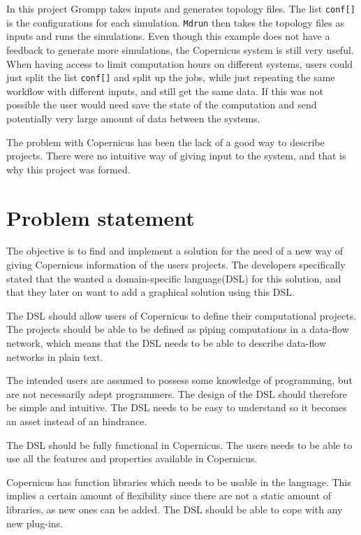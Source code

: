 In this project Grompp takes inputs and generates topology files. The
list \verb#conf[]# is the configurations for each
simulation. \verb#Mdrun# then takes the topology files as inputs and
runs the simulations. Even though this example does not have a
feedback to generate more simulations, the Copernicus system is still
very useful. When having access to limit computation hours on
different systems, users could just split the list \verb#conf[]# and
split up the jobs, while just repeating the same workflow with
different inputs, and still get the same data. If this was not
possible the user would need save the state of the computation and
send potentially very large amount of data between the systems.


The problem with Copernicus has been the lack of a good way to
describe projects. There were no intuitive way of giving input to the
system, and that is why this project was formed.


\section{Problem statement}
The objective is to find and implement a solution for the need of a
new way of giving Copernicus information of the users projects. The
developers specifically stated that the wanted a domain-specific
language(DSL) for this solution, and that they later on want to add a
graphical solution using this DSL.

The DSL should allow users of Copernicus to define their computational
projects. The projects should be able to be defined as piping
computations in a data-flow network, which means that the DSL needs to
be able to describe data-flow networks in plain text.

The intended users are assumed to possess some knowledge of
programming, but are not necessarily adept programmers. The design of
the DSL should therefore be simple and intuitive. The DSL needs to be
easy to understand so it becomes an asset instead of an hindrance.

The DSL should be fully functional in Copernicus. The users needs to
be able to use all the features and properties available in
Copernicus.

Copernicus has function libraries which needs to be usable in the
language. This implies a certain amount of flexibility since there are
not a static amount of libraries, as new ones can be added. The DSL
should be able to cope with any new plug-ins.

